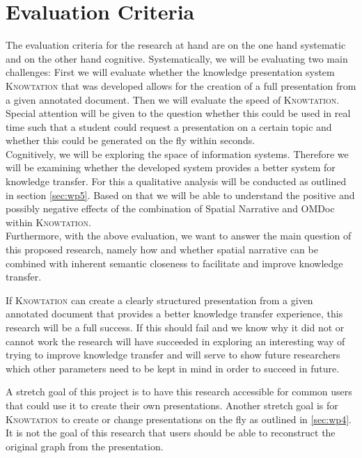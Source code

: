 \documentclass[twoside, 12pt]{article}
\newcommand{\sys}{\textsc{Knowtation}\xspace}
\begin{document}
\section{Evaluation Criteria}
\label{sec:evalcriteria}

The evaluation criteria for the research at hand are on the one hand systematic and on the other hand cognitive. Systematically, we will be evaluating two main challenges: First we will evaluate whether the knowledge presentation system \sys that was developed allows for the creation of a full presentation from a given annotated document. Then we will evaluate the speed of \sys. Special attention will be given to the question whether this could be used in real time such that a student could request a presentation on a certain topic and whether this could be generated on the fly within seconds.\\

Cognitively, we will be exploring the space of information systems. Therefore we will be examining whether the developed system provides a better system for knowledge transfer. For this a qualitative analysis will be conducted as outlined in section \ref{sec:wp5}. Based on that we will be able to understand the positive and possibly negative effects of the combination of Spatial Narrative and OMDoc within \sys .\\

Furthermore, with the above evaluation, we want to answer the main question of this proposed research, namely how and whether spatial narrative can be combined with inherent semantic closeness to facilitate and improve knowledge transfer.

If \sys can create a clearly structured presentation from a given annotated document that provides a better knowledge transfer experience, this research will be a full success. If this should fail and we know why it did not or cannot work the research will have succeeded in exploring an interesting way of trying to improve knowledge transfer and will serve to show future researchers which other parameters need to be kept in mind in order to succeed in future.

A stretch goal of this project is to have this research accessible for common users that could use it to create their own presentations. Another stretch goal is for \sys to create or change presentations on the fly as outlined in \ref{sec:wp4}. It is not the goal of this research that users should be able to reconstruct the original graph from the presentation.\\
\end{document}
